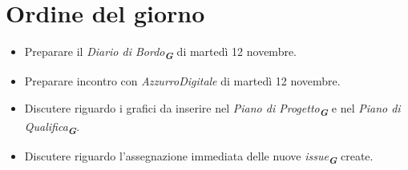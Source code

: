 

\section{Ordine del giorno}

\begin{itemize}
    \item Preparare il \emph{Diario di Bordo}\textsubscript{\textit{\textbf{G}}} di martedì 12 novembre.
    \item Preparare incontro con \emph{AzzurroDigitale} di martedì 12 novembre.
    \item Discutere riguardo i grafici da inserire nel \emph{Piano di Progetto}\textsubscript{\textit{\textbf{G}}} e nel \emph{Piano di Qualifica}\textsubscript{\textit{\textbf{G}}}.
    \item Discutere riguardo l'assegnazione immediata delle nuove \emph{issue}\textsubscript{\textit{\textbf{G}}} create.
\end{itemize}